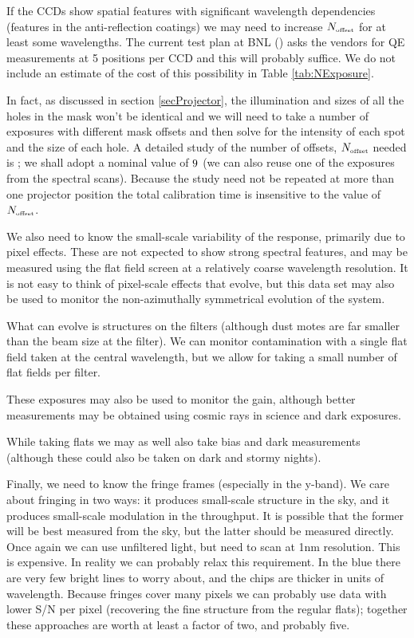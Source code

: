 If the CCDs show spatial features with significant wavelength dependencies (\eg features in the
anti-reflection coatings) we may need to increase $N_{\mbox{\tiny offset}}$ for at least some wavelengths. The current test
plan at BNL (\cite{GilmoreCCDTesting}) asks the vendors for QE measurements at 5 positions per CCD and this
will probably suffice.  We do not include an estimate of the cost of this possibility in Table
\ref{tab:NExposure}.

In fact, as discussed in section \ref{secProjector}, the illumination and sizes of all the holes in the mask
won't be identical and we will need to take a number of exposures with different mask offsets and then solve
for the intensity of each spot and the size of each hole.  A detailed study of the number of offsets,
$N_{\mbox{\tiny offset}}$ needed is \TBD; we shall adopt a nominal value of $9$ (we can also reuse one of the
exposures from the spectral scans).  Because the study need not be repeated at more than one projector
position the total calibration time is insensitive to the value of $N_{\mbox{\tiny offset}}$.

We also need to know the small-scale variability of the response, primarily due to pixel effects.  These are
not expected to show strong spectral features, and may be measured using the flat field screen at a relatively
coarse wavelength resolution.  It is not easy to think of pixel-scale
effects that evolve, but this data set may also be used to monitor the non-azimuthally symmetrical
evolution of the system.

What can evolve is structures on the filters (although dust motes are far smaller than the beam
size at the filter).  We can monitor contamination with a single flat field taken at the central wavelength,
but we allow for taking a small number of flat fields per filter.

These exposures may also be used to monitor the gain, although better measurements may be obtained using
cosmic rays in science and dark exposures.

While taking flats we may as well also take bias and dark measurements (although these could also be taken on
dark and stormy nights).

Finally, we need to know the fringe frames (especially in the y-band).  We care about fringing in two ways: it
produces small-scale structure in the sky, and it produces small-scale modulation in the throughput. It is
possible that the former will be best measured from the sky, but the latter should be measured directly. Once
again we can use unfiltered light, but need to scan at 1nm resolution. This is expensive.  In reality we can
probably relax this requirement.  In the blue there are very few bright lines to worry about, and the chips
are thicker in units of wavelength.  Because fringes cover many pixels we can probably use data with lower S/N
per pixel (recovering the fine structure from the regular flats);  together these approaches are worth
at least a factor of two, and probably five.

